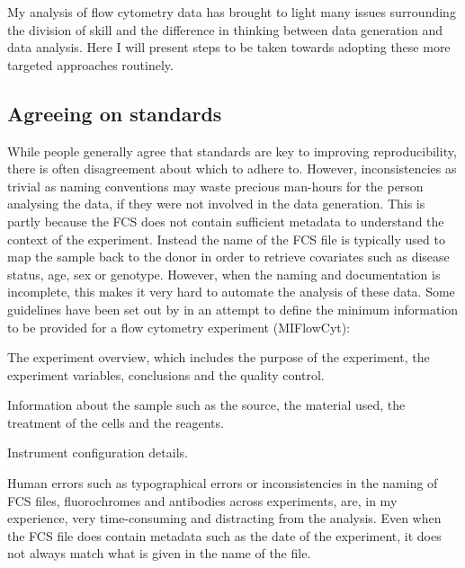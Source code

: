 My analysis of flow cytometry data has brought to light many issues surrounding the division of skill and the difference in thinking between data generation and data analysis.
Here I will present steps to be taken towards adopting these more targeted approaches routinely.

\subsection{Agreeing on standards}

While people generally agree that standards are key to improving reproducibility, there is often disagreement about which to adhere to.
However, inconsistencies as trivial as naming conventions may waste precious man-hours for the person analysing the data, if they were not involved in the data generation.
This is partly because the \acrfull{FCS} does not contain sufficient metadata to understand the context of the experiment.
Instead the name of the FCS file is typically used to map the sample back to the donor in order to retrieve covariates such as disease status, age, sex or genotype.
However, when the naming and documentation is incomplete, this makes it very hard to automate the analysis of these data.
Some guidelines have been set out by \citet{Lee:2008ed} in an attempt to define the minimum information to be provided for a flow cytometry experiment (MIFlowCyt):
\begin{itemise}
\item The experiment overview, which includes the purpose of the experiment, the experiment variables, conclusions and the quality control.
\item Information about the sample such as the source, the material used, the treatment of the cells and the reagents.
\item Instrument configuration details.
\end{itemise}
Human errors such as typographical errors or inconsistencies in the naming of FCS files, fluorochromes and antibodies across experiments, are, in my experience, very time-consuming and distracting from the analysis.
Even when the FCS file does contain metadata such as the date of the experiment, it does not always match what is given in the name of the file.

